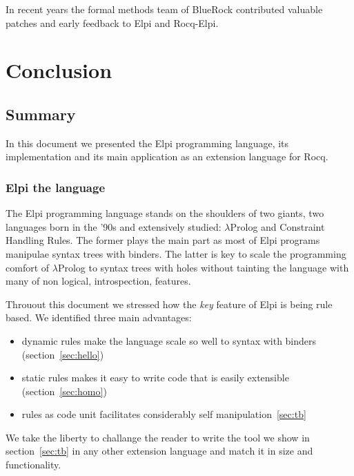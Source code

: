 \documentclass[a4paper, 11pt]{book}
\begin{document}
In recent years the formal methods team of BlueRock contributed valuable
patches and early feedback to Elpi and Rocq-Elpi.  

\chapter{Conclusion}

\section{Summary}

In this document we presented the Elpi programming language, its implementation
and its main application as an extension language for Rocq.

\subsection{Elpi the language}

The Elpi programming language stands on the shoulders of two giants, two
languages born in the '90s and extensively studied: $\lambda$Prolog and
Constraint Handling Rules. The former plays the main part as most of
Elpi programs manipulae syntax trees with binders. The latter is key to
scale the programming comfort of $\lambda$Prolog to syntax trees with holes
without tainting the language with many of non logical, introspection, features.
 
Throuout this document we stressed how the \emph{key} feature of Elpi is being
rule based. We identified three main advantages:
\begin{itemize}
\item dynamic rules make the language scale so well to syntax with binders (section~\ref{sec:hello})
\item static rules makes it easy to write code that is easily extensible (section~\ref{sec:homo})
\item rules as code unit facilitates considerably self manipulation~\ref{sec:tb}
\end{itemize}

We take the liberty to challange the reader to write the 
tool we show in section~\ref{sec:tb} in any other extension language and match
it in size and functionality.
\end{document}
